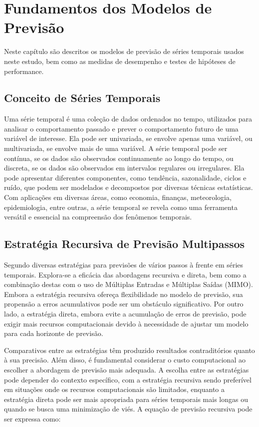 \section{Fundamentos dos Modelos de Previs\~ao}\label{sec:base}

 Neste capítulo são descritos os modelos de previsão de séries temporais usados neste estudo, bem como as medidas de desempenho e testes de hipóteses de performance. 
 
 \subsection{Conceito de S\'eries Temporais}
 
Uma série temporal é uma coleção de dados ordenados no tempo, utilizados para analisar o comportamento passado e prever o comportamento futuro de uma variável de interesse. Ela pode ser univariada, se envolve apenas uma variável, ou multivariada, se envolve mais de uma variável. A série temporal pode ser contínua, se os dados são observados continuamente ao longo do tempo, ou discreta, se os dados são observados em intervalos regulares ou irregulares. Ela pode apresentar diferentes componentes, como tendência, sazonalidade, ciclos e ruído, que podem ser modelados e decompostos por diversas técnicas estatísticas. Com aplicações em diversas áreas, como economia, finanças, meteorologia, epidemiologia, entre outras, a série temporal se revela como uma ferramenta versátil e essencial na compreensão dos fenômenos temporais.

\subsection{Estrat\'egia Recursiva de Previs\~ao Multipassos}

Segundo  diversas estratégias para previsões de vários passos à frente em séries temporais. Explora-se a eficácia das abordagens recursiva e direta, bem como a combinação destas com o uso de Múltiplas Entradas e Múltiplas Saídas (MIMO). Embora a estratégia recursiva ofereça flexibilidade no modelo de previsão, sua propensão a erros acumulativos pode ser um obstáculo significativo. Por outro lado, a estratégia direta, embora evite a acumulação de erros de previsão, pode exigir mais recursos computacionais devido à necessidade de ajustar um modelo para cada horizonte de previsão.

Comparativos entre as estratégias têm produzido resultados contraditórios quanto à sua precisão. Além disso, é fundamental considerar o custo computacional ao escolher a abordagem de previsão mais adequada. A escolha entre as estratégias pode depender do contexto específico, com a estratégia recursiva sendo preferível em situações onde os recursos computacionais são limitados, enquanto a estratégia direta pode ser mais apropriada para séries temporais mais longas ou quando se busca uma minimização de viés.
A equação de previsão recursiva pode ser expressa como:


